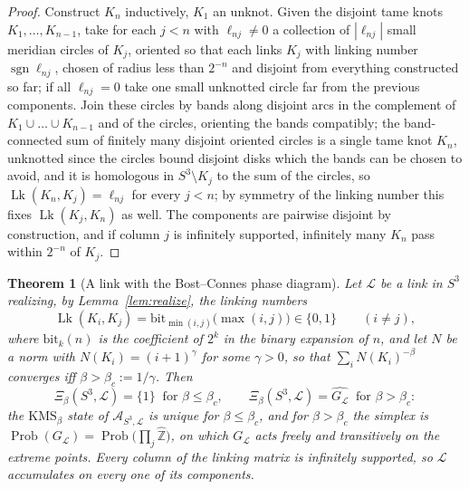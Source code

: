 \documentclass[11pt]{amsart}
\numberwithin{equation}{section}
\newtheorem{theorem}{Theorem}[section]
\theoremstyle{definition}
\theoremstyle{remark}
\newcommand{\Z}{\mathbb{Z}}
\newcommand{\hZ}{\widehat{\Z}}
\newcommand{\cA}{\mathcal{A}}
\newcommand{\cL}{\mathcal{L}}
\newcommand{\Lk}{\operatorname{Lk}}
\newcommand{\Prob}{\operatorname{Prob}}
\begin{document}
\begin{proof}
Construct $K_n$ inductively, $K_1$ an unknot. Given the disjoint tame knots $K_1,\dots,K_{n-1}$,
take for each $j<n$ with $\ell_{nj}\ne0$ a collection of $|\ell_{nj}|$ small meridian circles
of $K_j$, oriented so that each links $K_j$ with linking number $\operatorname{sgn}\ell_{nj}$,
chosen of radius less than $2^{-n}$ and disjoint from everything constructed so far; if all
$\ell_{nj}=0$ take one small unknotted circle far from the previous components. Join these
circles by bands along disjoint arcs in the complement of $K_1\cup\dots\cup K_{n-1}$ and of the
circles, orienting the bands compatibly; the band-connected sum of finitely many disjoint
oriented circles is a single tame knot $K_n$, unknotted since the circles bound disjoint disks
which the bands can be chosen to avoid, and it is homologous in $S^3\setminus K_j$ to the sum
of the circles, so $\Lk(K_n,K_j)=\ell_{nj}$ for every $j<n$; by symmetry of the linking number
this fixes $\Lk(K_j,K_n)$ as well. The components are pairwise disjoint by construction, and
if column $j$ is infinitely supported, infinitely many $K_n$ pass within $2^{-n}$ of $K_j$.
\end{proof}

\begin{theorem}[A link with the Bost--Connes phase diagram]\label{thm:BC}
Let $\cL$ be a link in $S^3$ realizing, by Lemma~\ref{lem:realize}, the linking numbers
\[
\Lk(K_i,K_j)=\mathrm{bit}_{\min(i,j)}\bigl(\max(i,j)\bigr)\in\{0,1\}\qquad(i\ne j),
\]
where $\mathrm{bit}_k(n)$ is the coefficient of $2^k$ in the binary expansion of $n$, and
let $N$ be a norm with $N(K_i)=(i+1)^\gamma$ for some $\gamma>0$, so that
$\sum_iN(K_i)^{-\beta}$ converges iff $\beta>\beta_c:=1/\gamma$. Then
\[
\Xi_\beta(S^3,\cL)=\{1\}\ \text{ for }\beta\le\beta_c,\qquad
\Xi_\beta(S^3,\cL)=\widehat{G_\cL}\ \text{ for }\beta>\beta_c :
\]
the $\mathrm{KMS}_\beta$ state of $\cA_{S^3,\cL}$ is unique for $\beta\le\beta_c$, and for
$\beta>\beta_c$ the simplex is $\Prob(G_\cL)=\Prob\bigl(\prod_j\hZ\bigr)$, on which $G_\cL$
acts freely and transitively on the extreme points. Every column of the linking matrix is
infinitely supported, so $\cL$ accumulates on every one of its components.
\end{theorem}
\end{document}
